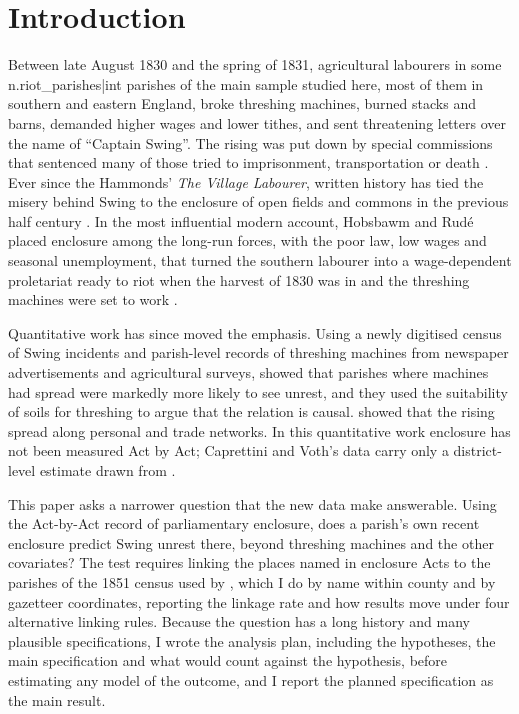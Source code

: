 \documentclass[11pt,a4paper]{article}
\begin{document}
\section{Introduction}
Between late August 1830 and the spring of 1831, agricultural labourers in some {{n.riot_parishes|int}} parishes of the main sample studied here, most of them in southern and eastern England, broke threshing machines, burned stacks and barns, demanded higher wages and lower tithes, and sent threatening letters over the name of ``Captain Swing''. The rising was put down by special commissions that sentenced many of those tried to imprisonment, transportation or death \citep{hobsbawmrude1969}. Ever since the Hammonds' \textit{The Village Labourer}, written history has tied the misery behind Swing to the enclosure of open fields and commons in the previous half century \citep{hammond1911}. In the most influential modern account, Hobsbawm and Rud\'e placed enclosure among the long-run forces, with the poor law, low wages and seasonal unemployment, that turned the southern labourer into a wage-dependent proletariat ready to riot when the harvest of 1830 was in and the threshing machines were set to work \citep{hobsbawmrude1969}.

Quantitative work has since moved the emphasis. Using a newly digitised census of Swing incidents \citep{holland2005} and parish-level records of threshing machines from newspaper advertisements and agricultural surveys, \citet{caprettinivoth2020} showed that parishes where machines had spread were markedly more likely to see unrest, and they used the suitability of soils for threshing to argue that the relation is causal. \citet{aidtleon2022} showed that the rising spread along personal and trade networks. In this quantitative work enclosure has not been measured Act by Act; Caprettini and Voth's data carry only a district-level estimate drawn from \citet{gonner1912}.

This paper asks a narrower question that the new data make answerable. Using the Act-by-Act record of parliamentary enclosure, does a parish's own recent enclosure predict Swing unrest there, beyond threshing machines and the other covariates? The test requires linking the places named in enclosure Acts to the parishes of the 1851 census used by \citet{caprettinivoth2020}, which I do by name within county and by gazetteer coordinates, reporting the linkage rate and how results move under four alternative linking rules. Because the question has a long history and many plausible specifications, I wrote the analysis plan, including the hypotheses, the main specification and what would count against the hypothesis, before estimating any model of the outcome, and I report the planned specification as the main result.
\end{document}
